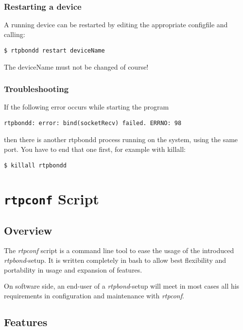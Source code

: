 \documentclass[a4paper]{book}%
\begin{document}
\subsubsection{Restarting a device}

A running device can be restarted by editing the appropriate configfile and calling:

\begin{verbatim}
$ rtpbondd restart deviceName
\end{verbatim}

The deviceName must not be changed of course!


\subsubsection{Troubleshooting}

If the following error occurs while starting the program

\begin{verbatim}
rtpbondd: error: bind(socketRecv) failed. ERRNO: 98
\end{verbatim}

then there is another rtpbondd process running on the system, using the same port. You have to end that one first, for example with killall:

\begin{verbatim}
$ killall rtpbondd
\end{verbatim}


\section{\texttt{rtpconf} Script}
\subsection{Overview}

The \emph{rtpconf} script is a command line tool to ease the usage of the introduced \emph{rtpbond}-setup. It is written completely in bash to allow best flexibility and portability in usage and expansion of features.

On software side, an end-user of a \emph{rtpbond}-setup will meet in most cases all his requirements in configuration and maintenance with \emph{rtpconf}.

\subsection{Features}
\end{document}
